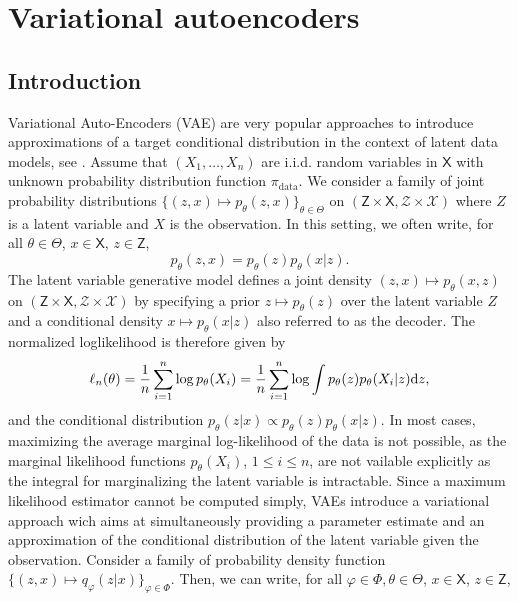 \documentclass[english,graybox,envcountchap,envcountsame,sectrefs,shortlabels]{svmono}
\theoremstyle{style}
\renewenvironment{keywords}{\textit{\bf Keywords: } \sffamily }{}
\newcommand{\eqsp}{}
\begin{document}
\chapter{Variational autoencoders}
\minitoc
\section{Introduction}
Variational Auto-Encoders (VAE) are very popular approaches to introduce approximations of a target conditional distribution in the context of latent data models, see \cite{rezende2014stochastic,kingma2019introduction}. Assume that $(X_1,\ldots,X_n)$ are i.i.d. random variables in $\mathsf{X}$ with unknown probability distribution function $\pi_{\mathrm{data}}$. We consider a family of joint probability distributions $\{(z,x) \mapsto  p_{\theta}(z,x)\}_{\theta\in\Theta}$ on $(\mathsf{Z}\times \mathsf{X}, \mathcal{Z}\times \mathcal{X})$ where $Z$ is a latent variable and $X$ is the observation. In this setting, we often write, for all $\theta\in\Theta$, $x\in\mathsf{X}$, $z\in\mathsf{Z}$,
$$
p_{\theta}(z,x) = p_{\theta}(z)p_{\theta}(x|z)\eqsp.
$$
The latent variable generative model defines a joint density $(z,x)\mapsto p_\theta(x, z)$  on $(\mathsf{Z}\times \mathsf{X}, \mathcal{Z}\times \mathcal{X})$  by specifying a prior $z\mapsto p_{\theta}(z)$ over the latent variable $Z$ and a conditional density $x\mapsto p_\theta(x|z)$ also referred to as the decoder.  The normalized loglikelihood is therefore given by
$$
\ell_n(\theta) = \frac{1}{n}\sum_{i=1}^n \log p_{\theta}(X_i) = \frac{1}{n}\sum_{i=1}^n \log \int p_{\theta}(z)p_{\theta}(X_i|z)\rmd z\eqsp,
$$
and the conditional distribution $p_{\theta}(z|x)\propto p_{\theta}(z)p_{\theta}(x|z)$. In most cases, maximizing the average
marginal log-likelihood of the data is not possible, as the marginal likelihood functions $p_{\theta}(X_i)$, $1\leqslant i \leqslant n$, are not vailable explicitly as the integral for marginalizing the latent variable is intractable.  Since a maximum likelihood estimator cannot be computed simply, VAEs introduce a variational approach wich aims at simultaneously providing a parameter estimate  and an approximation of the conditional distribution of the latent variable given the observation.  Consider a family of probability density function $\{(z,x) \mapsto q_{\varphi}(z|x)\}_{\varphi\in\Phi}$. Then, we can write, for all $\varphi\in\Phi,\theta\in\Theta$, $x\in\mathsf{X}$, $z\in\mathsf{Z}$,
\end{document}
